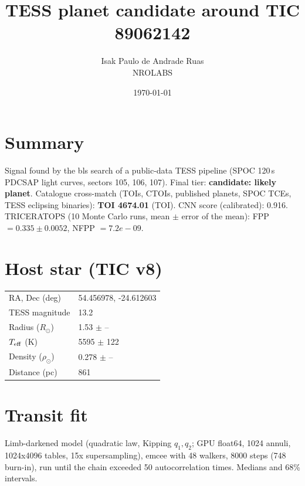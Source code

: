 \documentclass[11pt,a4paper]{article}
\title{TESS planet candidate around TIC 89062142}
\author{Isak Paulo de Andrade Ruas \\ NROLABS}
\date{\today}
\begin{document}
\maketitle

\section*{Summary}
Signal found by the bls search of a public-data TESS pipeline
(SPOC 120\,s PDCSAP light curves, sectors 105, 106, 107).
Final tier: \textbf{candidate: likely planet}.
Catalogue cross-match (TOIs, CTOIs, published planets, SPOC TCEs, TESS eclipsing binaries):
\textbf{TOI 4674.01} (TOI).
CNN score (calibrated): 0.916.
TRICERATOPS (10 Monte Carlo runs, mean $\pm$ error of the mean):
FPP $= 0.335 \pm 0.0052$,
NFPP $= 7.2e-09$.

\section*{Host star (TIC v8)}
\begin{tabular}{ll}\toprule
RA, Dec (deg) & 54.456978, -24.612603 \\
TESS magnitude & 13.2 \\
Radius ($R_\odot$) & 1.53 $\pm$ -- \\
$T_{\rm eff}$ (K) & 5595 $\pm$ 122 \\
Density ($\rho_\odot$) & 0.278 $\pm$ -- \\
Distance (pc) & 861 \\\bottomrule
\end{tabular}

\section*{Transit fit}
Limb-darkened model (quadratic law, Kipping $q_1,q_2$; GPU float64, 1024 annuli, 1024x4096 tables, 15x supersampling), emcee with 48 walkers,
8000 steps (748 burn-in), run until the chain exceeded 50 autocorrelation times.
Medians and 68\% intervals.
\end{document}
